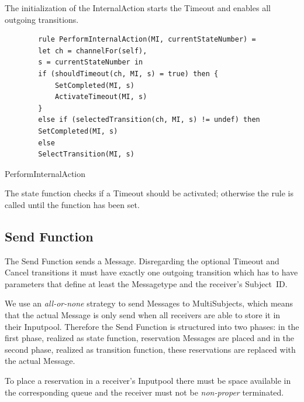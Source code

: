 The initialization of the InternalAction starts the Timeout and enables all
outgoing transitions.


\begin{listing}[H]
	\begin{verbatim}
		rule PerformInternalAction(MI, currentStateNumber) =
		let ch = channelFor(self),
		s = currentStateNumber in
		if (shouldTimeout(ch, MI, s) = true) then {
			SetCompleted(MI, s)
			ActivateTimeout(MI, s)
		}
		else if (selectedTransition(ch, MI, s) != undef) then
		SetCompleted(MI, s)
		else
		SelectTransition(MI, s)
	\end{verbatim}
	\caption{PerformInternalAction}
	\label{lst:shortasm:PerformInternalAction}
\end{listing}


The state function checks if a Timeout should be activated; otherwise the
 rule is called until the  function has
been set.




\subsection{Send Function}


The Send Function sends a Message. Disregarding the optional Timeout and Cancel
transitions it must have exactly one outgoing transition which has to have parameters that
define at least the Messagetype and the receiver's Subject~ID.

We use an \textit{all-or-none} strategy to send Messages to MultiSubjects,
which means that the actual Message is only send when all receivers are able
to store it in their Inputpool. Therefore the Send Function is structured into
two phases: in the first phase, realized as state function, reservation Messages
are placed and in the second phase, realized as transition function, these reservations
are replaced with the actual Message.

To place a reservation in a receiver's Inputpool there must be space available
in the corresponding queue and the receiver must not be
\textit{non-proper} terminated.


